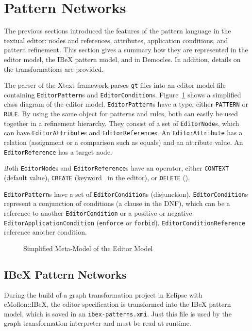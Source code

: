 \section{Pattern Networks}
\label{pattern-networks}
The previous sections introduced the features of the pattern language in the textual editor: nodes and references, attributes, application conditions, and pattern refinement.
This section gives a summary how they are represented in the editor model, the IBeX pattern model, and in Democles.
In addition, details on the transformations are provided.

The parser of the Xtext framework parses \texttt{gt} files into an editor model file containing \texttt{EditorPattern}s and \texttt{EditorCondition}s.
Figure~\ref{fig:editor-patterns-meta-model} shows a simplified class diagram of the editor model.
\texttt{EditorPattern}s have a type, either \texttt{PATTERN} or \texttt{RULE}.
By using the same object for patterns and rules, both can easily be used together in a refinement hierarchy.
They consist of a set of \texttt{EditorNode}s, which can have \texttt{EditorAttribute}s and \texttt{EditorReference}s.
An \texttt{EditorAttribute} has a relation (assignment or a comparison such as equals) and an attribute value.
An \texttt{EditorReference} has a target node.

Both \texttt{EditorNode}s and \texttt{EditorReference}s have an operator, either \texttt{CONTEXT} (default value), \texttt{CREATE} (keyword \create~in the editor), or \texttt{DELETE} (\delete).

\texttt{EditorPattern}s have a set of \texttt{EditorCondition}s (disjunction).
\texttt{EditorCondition}s represent a conjunction of conditions (a clause in the DNF), which can be a reference to another \texttt{EditorCondition} or a positive or negative \texttt{EditorApplicationCondition} (\texttt{enforce} or \texttt{forbid}).
\texttt{EditorConditionReference} reference another condition.

\begin{figure}[H]
	\centering
	
	\caption{Simplified Meta-Model of the Editor Model}
	\label{fig:editor-patterns-meta-model}
\end{figure}

\subsection{IBeX Pattern Networks}
\label{ibex-pattern-networks}
During the build of a graph transformation project in Eclipse with eMoflon::IBeX, the editor specification is transformed into the IBeX pattern model, which is saved in an \texttt{ibex-patterns.xmi}.
Just this file is used by the graph transformation interpreter and must be read at runtime.

